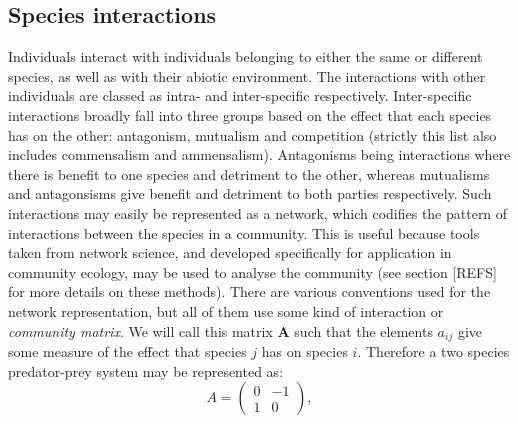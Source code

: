 \subsection{Species interactions}
\label{sec:intro_interactions}

Individuals interact with individuals belonging to either the same or different species, as well as with their abiotic environment. The interactions with other individuals are classed as intra- and inter-specific respectively. Inter-specific interactions broadly fall into three groups based on the effect that each species has on the other: antagonism, mutualism and competition (strictly this list also includes commensalism and ammensalism). Antagonisms being interactions where there is benefit to one species and detriment to the other, whereas mutualisms and antagonsisms give  benefit and detriment to both parties respectively. Such interactions may easily be represented as a network, which codifies the pattern of interactions between the species in a community. This is useful because tools taken from network science, and developed specifically for application in community ecology, may be used to analyse the community (see section [REFS] for more details on these methods). There are various conventions used for the network representation, but all of them use some kind of interaction or \emph{community matrix}. We will call this matrix $\mathbf{A}$ such that the elements $a_{ij}$ give some measure of the effect that species $j$ has on species $i$. Therefore a two species predator-prey system may be represented as:
\begin{equation}
A = 
\begin{pmatrix}
0 & -1 \\
1 & 0
\end{pmatrix},
\label{eq:example_adj}
\end{equation}
